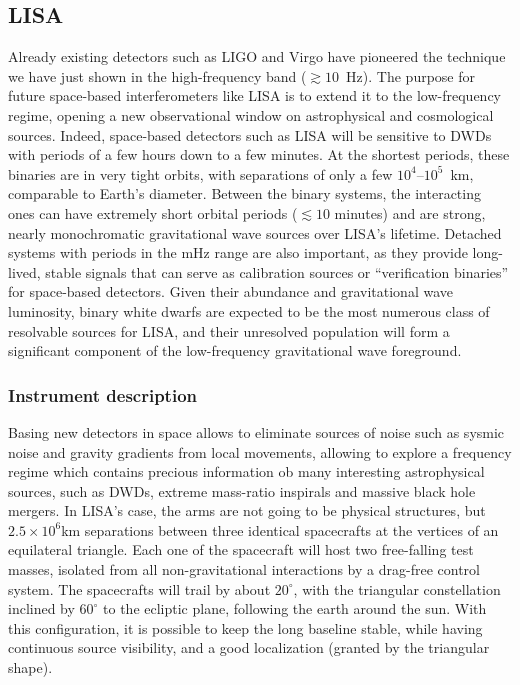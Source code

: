 \subsection{LISA}
Already existing detectors such as LIGO and Virgo have pioneered the technique we have just shown in the high-frequency band ($\gtrsim 10$~Hz).
The purpose for future space-based interferometers like LISA is to extend it to the low-frequency regime, opening a new observational window on astrophysical and cosmological sources.
Indeed, space-based detectors such as LISA will be sensitive to DWDs with periods of a few hours down to a few minutes.  
At the shortest periods, these binaries are in very tight orbits, with separations of only a few $10^{4}$–$10^{5}$~km, comparable to Earth's diameter.
Between the binary systems, the interacting ones can have extremely short orbital periods ($\lesssim 10$ minutes) and are strong, nearly monochromatic gravitational wave sources over LISA's lifetime.  
Detached systems with periods in the mHz range are also important, as they provide long-lived, stable signals that can serve as calibration sources or ``verification binaries'' for space-based detectors.
Given their abundance and gravitational wave luminosity, binary white dwarfs are expected to be the most numerous class of resolvable sources for LISA, and their unresolved population will form a significant component of the low-frequency gravitational wave foreground.

\subsubsection{Instrument description}
Basing new detectors in space allows to eliminate sources of noise such as sysmic noise and gravity gradients from local movements, allowing to explore a frequency regime which contains precious information ob many interesting astrophysical sources, such as DWDs, extreme mass-ratio inspirals and massive black hole mergers.
In LISA's case, the arms are not going to be physical structures, but $2.5\times10^6$km separations between three identical spacecrafts at the vertices of an equilateral triangle.
Each one of the spacecraft will host two free-falling test masses, isolated from all non-gravitational interactions by a drag-free control system.
The spacecrafts will trail by about $20^{\circ}$, with the triangular constellation inclined by $60^{\circ}$ to the ecliptic plane, following the earth around the sun.
With this configuration, it is possible to keep the long baseline stable, while having continuous source visibility, and a good localization (granted by the triangular shape).

